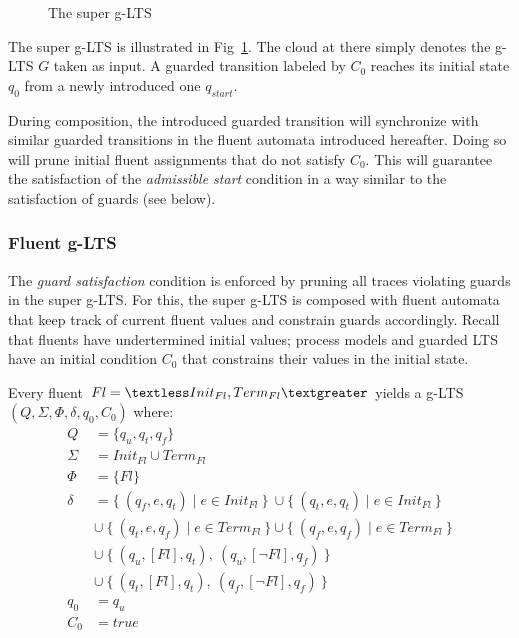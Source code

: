 \begin{figure}[H]
\centering
{}
\caption{The super g-LTS\label{image:super-lts}}
\end{figure}

The super g-LTS is illustrated in Fig~\ref{image:super-lts}. The cloud at there simply denotes the g-LTS $G$ taken as input. A guarded transition labeled by $C_0$ reaches its initial state $q_0$ from a newly introduced one $q_{start}$.

During composition, the introduced guarded transition will synchronize with similar guarded transitions in the fluent automata introduced hereafter. Doing so will prune initial fluent assignments that do not satisfy $C_0$. This will guarantee the satisfaction of the \emph{admissible start} condition in a way similar to the satisfaction of guards (see below).

\subsubsection*{Fluent g-LTS}

The \emph{guard satisfaction} condition is enforced by pruning all traces violating guards in the super g-LTS. For this, the super g-LTS is composed with fluent automata that keep track of current fluent values and constrain guards accordingly. Recall that fluents have undertermined initial values; process models and guarded LTS have an initial condition $C_0$ that constrains their values in the initial state. 

Every fluent $Fl = \textless Init_{Fl}, Term_{Fl} \textgreater $ yields a g-LTS $(Q,\Sigma,\Phi,\delta,q_{0},C_{0})$ where:
\begin{align*}
Q      &= \{q_u,q_t,q_f\}            \\
\Sigma &= Init_{Fl} \cup Term_{Fl}   \\
\Phi   &= \{ Fl \} \\
\delta &=    \{~(q_f,e,q_t) \mid e \in Init_{Fl}~\}~\cup \{~(q_t,e,q_t) \mid e \in Init_{Fl}~\} \\
       &\cup~\{~(q_t,e,q_f) \mid e \in Term_{Fl}~\} \cup \{~(q_f,e,q_f) \mid e \in Term_{Fl}~\} \\
       &\cup~\{~(q_u, [Fl], q_t),~(q_u, [\neg Fl], q_f)~\} \\
       &\cup~\{~(q_t, [Fl], q_t),~(q_f, [\neg Fl], q_f)~\} \\
q_0    &= q_u \\
C_0    &= true
\end{align*}


